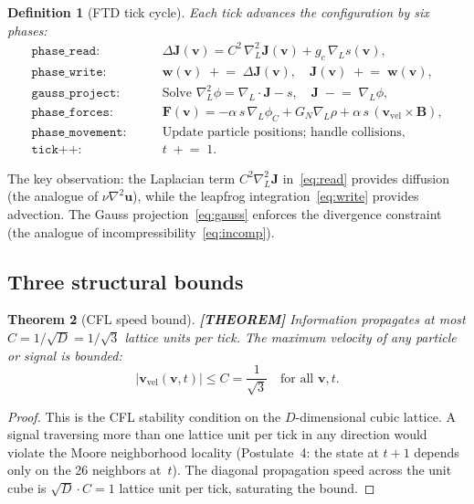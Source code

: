 \documentclass[11pt]{article}
\theoremstyle{tight}
\newtheorem{theorem}{Theorem}[section]
\theoremstyle{plainroman}
\newtheorem{definition}[theorem]{Definition}
\begin{document}
\begin{definition}[FTD tick cycle]\label{def:tick}
Each tick advances the configuration by six phases:
\begin{align}
\texttt{phase\_read:} \qquad &\Delta\mathbf J(\mathbf v)=C^2\,\nabla_L^2\mathbf J(\mathbf v)+g_c\,\nabla_L s(\mathbf v), \label{eq:read}\\
\texttt{phase\_write:} \qquad &\mathbf w(\mathbf v)\;\mathrel{+}=\;\Delta\mathbf J(\mathbf v), \quad \mathbf J(\mathbf v)\;\mathrel{+}=\;\mathbf w(\mathbf v), \label{eq:write}\\
\texttt{gauss\_project:} \qquad &\text{Solve } \nabla_L^2\phi=\nabla_L\!\cdot\!\mathbf J-s, \quad \mathbf J\;\mathrel{-}=\;\nabla_L\phi, \label{eq:gauss}\\
\texttt{phase\_forces:} \qquad &\mathbf F(\mathbf v)=-\alpha\,s\,\nabla_L\phi_C+G_N\nabla_L\rho+\alpha\,s\,(\mathbf v_{\mathrm{vel}}\times\mathbf B), \label{eq:forces}\\
\texttt{phase\_movement:} \qquad &\text{Update particle positions; handle collisions}, \label{eq:move}\\
\texttt{tick++:} \qquad &t\;\mathrel{+}=\;1. \label{eq:tick}
\end{align}
\end{definition}

The key observation: the Laplacian term $C^2\nabla_L^2\mathbf J$ in~\eqref{eq:read} provides diffusion (the analogue of $\nu\nabla^2\mathbf u$), while the leapfrog integration~\eqref{eq:write} provides advection.
The Gauss projection~\eqref{eq:gauss} enforces the divergence constraint (the analogue of incompressibility~\eqref{eq:incomp}).

\subsection{Three structural bounds}

\begin{theorem}[CFL speed bound]\label{thm:cfl}
\textbf{[THEOREM]}
Information propagates at most $C=1/\sqrt{D}=1/\sqrt{3}$ lattice units per tick.
The maximum velocity of any particle or signal is bounded:
\[
|\mathbf v_{\mathrm{vel}}(\mathbf v,t)|\le C=\frac{1}{\sqrt{3}} \quad \text{for all } \mathbf v,t.
\]
\end{theorem}
\begin{proof}
This is the CFL stability condition on the $D$-dimensional cubic lattice.
A signal traversing more than one lattice unit per tick in any direction would violate the Moore neighborhood locality (Postulate~4: the state at $t+1$ depends only on the 26 neighbors at~$t$).
The diagonal propagation speed across the unit cube is $\sqrt{D}\cdot C=1$ lattice unit per tick, saturating the bound.
\end{proof}
\end{document}
